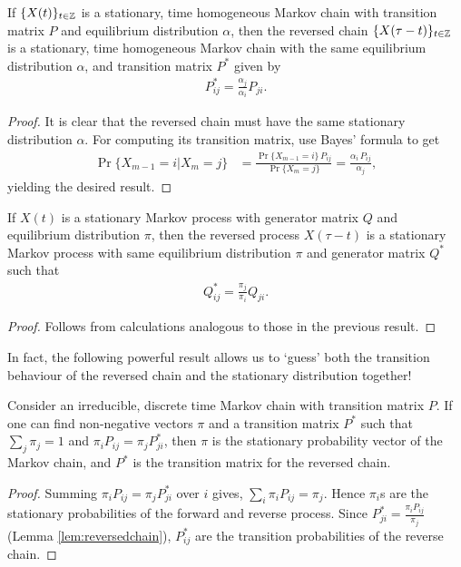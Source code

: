 \documentclass[a4paper,10pt,english]{article}
\begin{document}
\begin{lem}  
\label{lem:reversedchain}
If $\{X(t)\}_{t \in \mathbb{Z}}$ is a stationary, time homogeneous Markov chain with transition matrix $P$ and 
equilibrium distribution $\alpha$, then the reversed chain $\{X(\tau -t)\}_{t \in \mathbb{Z}}$ is a stationary, time homogeneous Markov chain with the same equilibrium distribution $\alpha$, and transition matrix $P^{\ast}$ given by
\begin{align*}
P^{\ast}_{ij} = \frac{\alpha_j}{\alpha_i}P_{ji}.
\end{align*}
\end{lem}
\begin{proof} 
It is clear that the reversed chain must have the same stationary distribution $\alpha$. For computing its transition matrix, use Bayes' formula to get
\begin{align*}
\Pr\{X_{m-1}=i|X_m=j\} &= \frac{\Pr\{X_{m-1}=i\} \, P_{ij}  }{ \Pr\{X_{m}=j\} } =\frac{\alpha_i \, P_{ij}  }{ \alpha_j },
\end{align*}
yielding the desired result. 
\end{proof}

\begin{lem} 
If $X(t)$ is a stationary Markov process with generator matrix $Q$ and equilibrium distribution $\pi$, then the reversed process $X(\tau -t)$ is a stationary Markov process with same equilibrium distribution $\pi$ and generator matrix $Q^{\ast}$ such that
\begin{align*}
Q^{\ast}_{ij} = \frac{\pi_j}{\pi_i}Q_{ji}.
\end{align*}
\end{lem}
\begin{proof} 
Follows from calculations analogous to those in the previous result. 
\end{proof}

In fact, the following powerful result allows us to `guess' both the transition behaviour of the reversed chain and the stationary distribution together!

\begin{thm}
\label{thm:guessReversal}
Consider an irreducible, discrete time Markov chain with transition matrix $P$. If one can find non-negative vectors $\pi$ and a transition matrix $P^\ast$ such that $\sum_j \pi_j =1$ and $\pi_iP_{ij}=\pi_jP^*_{ji}$, then $\pi$ is the stationary probability vector of the Markov chain, and $P^*$ is the transition matrix for the reversed chain.
\end{thm}
\begin{proof}
Summing $\pi_iP_{ij}=\pi_jP_{ji}^*$ over $i$ gives, $\sum_{i}\pi_iP_{ij}=\pi_j$. Hence $\pi_i$s are the stationary probabilities of the forward and reverse process. Since $P_{ji}^*=\frac{\pi_iP_{ij}}{\pi_j}$ (Lemma \ref{lem:reversedchain}), $P_{ij}^*$ are the transition probabilities of the reverse chain.
\end{proof} 
\end{document}
